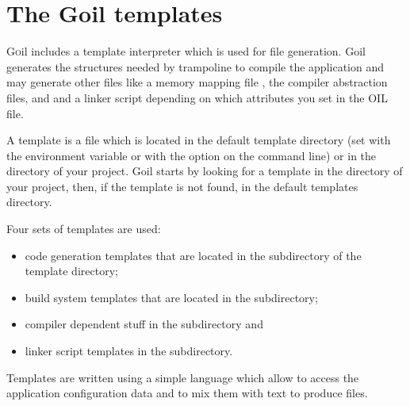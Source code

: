 
\chapter{The Goil templates}
\label{chap:goiltemplates}

\lettrine{G}oil includes a template interpreter which is used for file generation. Goil generates the structures needed by trampoline to compile the application and may generate other files like a memory mapping file , the compiler abstraction files,  and  and a linker script depending on which attributes you set in the OIL file. 

A template is a file which is located in the default template directory (set with the environment variable  or with the  option on the command line) or in the directory of your project. Goil starts by looking for a template in the directory of your project, then, if the template is not found, in the default templates directory.

Four sets of templates are used:
\begin{itemize}
\item code generation templates that are located in the  subdirectory of the template directory;
\item build system templates that are located in the  subdirectory;
\item compiler dependent stuff in the  subdirectory and
\item linker script templates in the  subdirectory.
\end{itemize}

Templates are written using a simple language which allow to access the application configuration data and to mix them with text to produce files.

